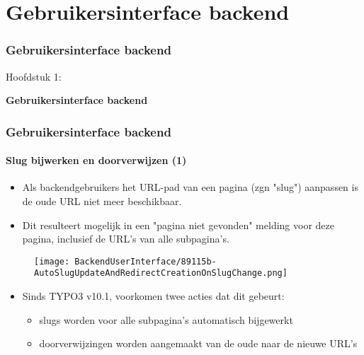 %

\section{Gebruikersinterface backend}
\begin{frame}[fragile]
	\frametitle{Gebruikersinterface backend}

	\begin{center}\huge{Hoofdstuk 1:}\end{center}
	\begin{center}\huge{\color{typo3darkgrey}\textbf{Gebruikersinterface backend}}\end{center}

\end{frame}


\begin{frame}[fragile]
	\frametitle{Gebruikersinterface backend}
	\framesubtitle{Slug bijwerken en doorverwijzen (1)}

	\begin{itemize}
		\item Als backendgebruikers het URL-pad van een pagina (zgn "slug") aanpassen
			is de oude URL niet meer beschikbaar.
		\item Dit resulteert mogelijk in een "pagina niet gevonden" melding voor deze
			pagina, inclusief de URL's van alle subpagina's.
	\end{itemize}

	\begin{figure}
		\texttt{[image: BackendUserInterface/89115b-AutoSlugUpdateAndRedirectCreationOnSlugChange.png]}
	\end{figure}

	\begin{itemize}
		\item Sinds TYPO3 v10.1, voorkomen twee acties dat dit gebeurt:

			\begin{itemize}
				\item slugs worden voor alle subpagina's automatisch bijgewerkt
				\item doorverwijzingen worden aangemaakt van de oude naar de nieuwe URL's
			\end{itemize}

	\end{itemize}

\end{frame}


